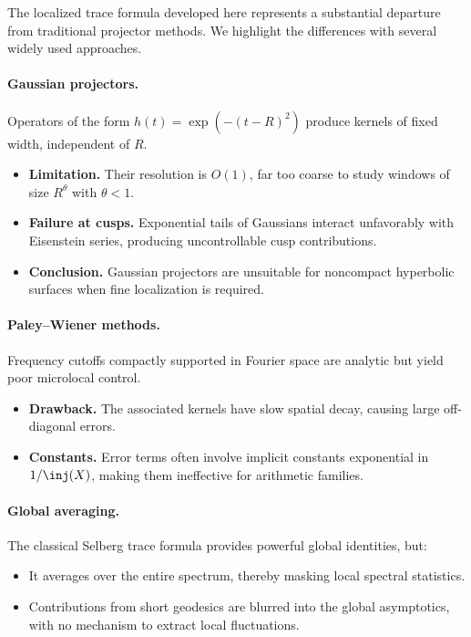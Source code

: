 The localized trace formula developed here represents a substantial departure from
traditional projector methods. We highlight the differences with several widely used
approaches.

\paragraph{Gaussian projectors.}
Operators of the form $h(t)=\exp(-(t-R)^2)$ produce kernels of fixed width, independent of
$R$.  
\begin{itemize}
  \item \textbf{Limitation.} Their resolution is $O(1)$, far too coarse to study windows of
        size $R^\theta$ with $\theta<1$.  
  \item \textbf{Failure at cusps.} Exponential tails of Gaussians interact unfavorably with
        Eisenstein series, producing uncontrollable cusp contributions.  
  \item \textbf{Conclusion.} Gaussian projectors are unsuitable for noncompact hyperbolic
        surfaces when fine localization is required.
\end{itemize}

\paragraph{Paley–Wiener methods.}
Frequency cutoffs compactly supported in Fourier space are analytic but yield poor
microlocal control.  
\begin{itemize}
  \item \textbf{Drawback.} The associated kernels have slow spatial decay, causing large
        off-diagonal errors.  
  \item \textbf{Constants.} Error terms often involve implicit constants exponential in
        $1/\inj(X)$, making them ineffective for arithmetic families.  
\end{itemize}

\paragraph{Global averaging.}
The classical Selberg trace formula provides powerful global identities, but:  
\begin{itemize}
  \item It averages over the entire spectrum, thereby masking local spectral statistics.  
  \item Contributions from short geodesics are blurred into the global asymptotics, with no
        mechanism to extract local fluctuations.  
\end{itemize}

